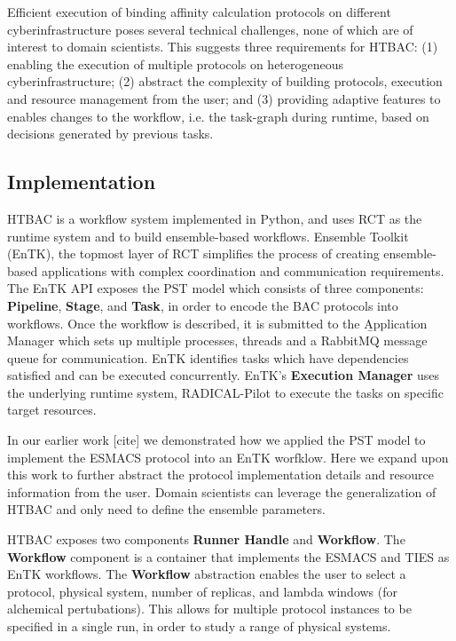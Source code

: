 Efficient execution of binding affinity calculation protocols on different
cyberinfrastructure poses several technical challenges, none of which are of
interest to domain scientists. This suggests three requirements for HTBAC\@:
(1) enabling the execution of multiple protocols on heterogeneous
cyberinfrastructure; (2) abstract the complexity of building protocols,
execution and resource management from the user; and (3) providing adaptive
features to enables changes to the workflow, i.e. the task-graph during
runtime, based on decisions generated by previous tasks.


\subsection{Implementation}

HTBAC is a workflow system implemented in Python, and uses RCT as the runtime
system and to build ensemble-based workflows. Ensemble Toolkit (EnTK), the
topmost layer of RCT simplifies the process of creating ensemble-based
applications with complex coordination and communication requirements. The
EnTK API exposes the PST model which consists of three components:
\textbf{Pipeline}, \textbf{Stage}, and \textbf{Task}, in order to encode the
BAC protocols into workflows. Once the workflow is described, it is submitted
to the \b{Application Manager} which sets up multiple processes, threads and
a RabbitMQ message queue for communication. EnTK identifies tasks which have
dependencies satisfied and can be executed concurrently. EnTK's
\textbf{Execution Manager} uses the underlying runtime system, RADICAL-Pilot
to execute the tasks on specific target resources.

In our earlier work [cite] we demonstrated how we applied the PST model to
implement the ESMACS protocol into an EnTK worfklow. Here we expand upon this
work to further abstract the protocol implementation details and resource
information from the user. Domain scientists can leverage the generalization
of HTBAC and only need to define the ensemble parameters.

HTBAC exposes two components \textbf{Runner Handle} and \textbf{Workflow}.
The \textbf{Workflow} component is a container that implements the ESMACS and
TIES as EnTK workflows. The \textbf{Workflow} abstraction enables the user to
select a protocol, physical system, number of replicas, and lambda windows
(for alchemical pertubations). This allows for multiple protocol instances to
be specified in a single run, in order to study a range of physical systems.

